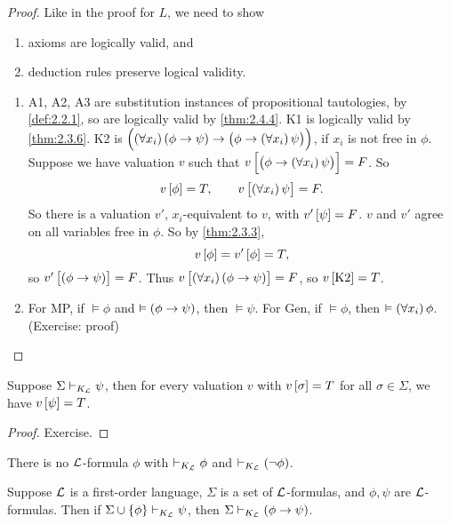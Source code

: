 \begin{proof}
Like in the proof for $ L $, we need to show
\begin{enumerate}
\item axioms are logically valid, and
\item deduction rules preserve logical validity.
\end{enumerate}
\begin{enumerate}
\item A1, A2, A3 are substitution instances of propositional tautologies, by \ref{def:2.2.1}, so are logically valid by \ref{thm:2.4.4}. K1 is logically valid by \ref{thm:2.3.6}. K2 is $ \impb{\fab{x_i}\impb{\phi}{\psi}}{\impb{\phi}{\fab{x_i}\psi}} $, if $ x_i $ is not free in $ \phi $. Suppose we have valuation $ v $ such that $ v\sbr{\impb{\phi}{\fab{x_i}\psi}} = F $. So
$$ v\sbr{\phi} = T, \qquad v\sbr{\fab{x_i}\psi} = F. $$
So there is a valuation $ v' $, $ x_i $-equivalent to $ v $, with $ v'\sbr{\psi} = F $. $ v $ and $ v' $ agree on all variables free in $ \phi $. So by \ref{thm:2.3.3},
$$ v\sbr{\phi} = v'\sbr{\phi} = T, $$
so $ v'\sbr{\impb{\phi}{\psi}} = F $. Thus $ v\sbr{\fab{x_i}\impb{\phi}{\psi}} = F $, so $ v\sbr{\text{K2}} = T $.
\item For MP, if $ \vDash \phi $ and $ \vDash \impb{\phi}{\psi} $, then $ \vDash \psi $. For Gen, if $ \vDash \phi $, then $ \vDash \fab{x_i}\phi $. (Exercise: proof)
\end{enumerate}
\end{proof}

\pagebreak

\begin{example}
\label{eg:2.4.6}
Suppose $ \Sigma \vdash_{K_{\mathcal{L}}} \psi $, then for every valuation $ v $ with $ v\sbr{\sigma} = T $ for all $ \sigma \in \Sigma $, we have $ v\sbr{\psi} = T $.
\end{example}

\begin{proof}
Exercise.
\end{proof}

\begin{corollary}
\label{cor:2.4.7}
There is no $ \mathcal{L} $-formula $ \phi $ with $ \vdash_{K_{\mathcal{L}}} \phi $ and $ \vdash_{K_\LL} \notb{\phi} $.
\end{corollary}

\begin{theorem}
Suppose $ \mathcal{L} $ is a first-order language, $ \Sigma $ is a set of $ \mathcal{L} $-formulas, and $ \phi, \psi $ are $ \mathcal{L} $-formulas. Then if $ \Sigma \cup \cbr{\phi} \vdash_{K_\LL} \psi $, then $ \Sigma \vdash_{K_\LL} \impb{\phi}{\psi} $.
\end{theorem}

